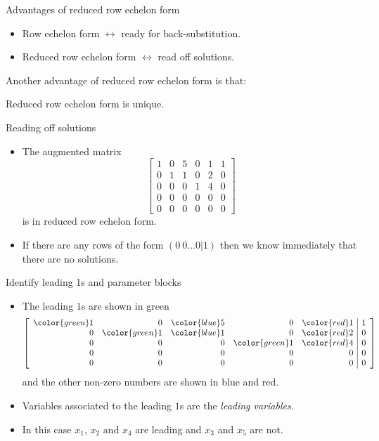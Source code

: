 \documentclass{beamer}
\begin{document}
\begin{frame}{Advantages of reduced row echelon form}
  \begin{itemize}
  \item Row echelon form $\leftrightarrow$ ready for back-substitution.\vfill
  \item Reduced row echelon form $\leftrightarrow$ read off solutions.
  \end{itemize}\vfill
  Another advantage of reduced row echelon form is that:\vfill
  \begin{theorem}
    Reduced row echelon form is unique.
  \end{theorem}
\end{frame}

\begin{frame}{Reading off solutions}
  \begin{itemize}
  \item   The augmented matrix
    \begin{equation*}
      \left[
        \begin{array}{rrrrr|r}
          1 & 0 & 5 & 0 & 1 &1 \\
          0 & 1 & 1 & 0 & 2 &0 \\
          0 & 0 & 0 & 1 & 4 &0 \\
          0 & 0 & 0 & 0 & 0 &0\\
          0 & 0 & 0 & 0 & 0 &0
        \end{array}\right] 
    \end{equation*}
    is in reduced row echelon form.\vfill
  \item If there are any rows of the form $(0~ 0...0|1)$ then we know immediately that there are no solutions.
  \end{itemize}
\end{frame}

\begin{frame}{Identify leading 1s and parameter blocks}
  \begin{itemize}
  \item The leading $1$s are shown in green
    \begin{equation*}
      \left[\begin{array}{rrrrr|r}
               {\color{green}1} & 0 & {\color{blue}5} & 0 & {\color{red}1} &1 \\
               0 & {\color{green}1} & {\color{blue}1} & 0 & {\color{red}2} &0 \\
               0 & 0 & 0 & {\color{green}1} & {\color{red}4} &0 \\
               0 & 0 & 0 & 0 & 0 &0\\
               0 & 0 & 0 & 0 & 0 &0
            \end{array}\right] 
        \end{equation*}
        and the other non-zero numbers are shown in blue and red.\vfill
      \item Variables associated to the leading $1$s are the \emph{leading variables}.\vfill
      \item In this case $x_1$, $x_2$ and $x_4$ are leading and $x_3$ and $x_5$ are not.
  \end{itemize}
\end{frame}
\end{document}
